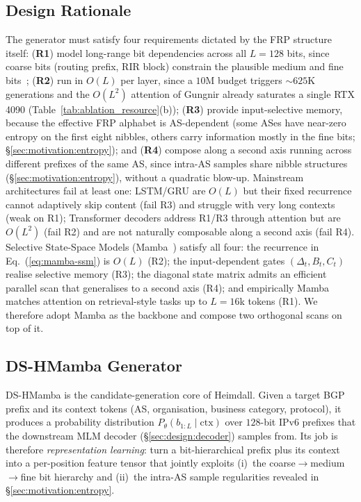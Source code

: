 \documentclass[conference]{IEEEtran}
\begin{document}
\subsection{Design Rationale}
\label{sec:design:why-mamba}
The generator must satisfy four requirements dictated by the FRP
structure itself:
(\textbf{R1}) model long-range bit dependencies across all $L{=}128$
bits, since coarse bits (routing prefix, RIR block) constrain the
plausible medium and fine
bits~\cite{hinden2006rfc4291,deering1998ipv6};
(\textbf{R2}) run in $O(L)$ per layer, since a $10$M budget triggers
$\sim\!625$K generations and the $O(L^2)$ attention of Gungnir already
saturates a single RTX 4090
(Table~\ref{tab:ablation_resource}(b));
(\textbf{R3}) provide input-selective memory, because the effective
FRP alphabet is AS-dependent (some ASes have near-zero entropy on the
first eight nibbles, others carry information mostly in the fine bits;
\S\ref{sec:motivation:entropy});
and (\textbf{R4}) compose along a second axis running across
different prefixes of the same AS, since intra-AS samples share
nibble structures (\S\ref{sec:motivation:entropy}), without a
quadratic blow-up.
Mainstream architectures fail at least one: LSTM/GRU are $O(L)$
but their fixed recurrence cannot adaptively skip content
(fail R3) and struggle with very long contexts (weak on R1);
Transformer decoders address R1/R3 through attention but are
$O(L^2)$ (fail R2) and are not naturally composable along a
second axis (fail R4).  Selective State-Space Models
(Mamba~\cite{gu2023mamba,gu2021s4}) satisfy all four: the
recurrence in Eq.~(\ref{eq:mamba-ssm}) is $O(L)$ (R2); the
input-dependent gates $(\Delta_t,B_t,C_t)$ realise selective
memory (R3); the diagonal state matrix admits an efficient
parallel scan that generalises to a second axis (R4); and
empirically Mamba matches attention on retrieval-style tasks up
to $L{=}16$k tokens (R1).  We therefore adopt Mamba as the
backbone and compose two orthogonal scans on top of it.

\subsection{DS-HMamba Generator}
\label{sec:design:model}
DS-HMamba is the candidate-generation
core of Heimdall.  Given a target BGP prefix and its context
tokens (AS, organisation, business category, protocol), it
produces a probability distribution
$P_\theta(b_{1:L}\mid\text{ctx})$ over $128$-bit IPv6 prefixes
that the downstream MLM decoder (\S\ref{sec:design:decoder})
samples from.  Its job is therefore \emph{representation
learning}: turn a bit-hierarchical prefix plus its context into
a per-position feature tensor that jointly exploits (i)~the
coarse$\to$medium$\to$fine bit hierarchy and (ii)~the intra-AS
sample regularities revealed in \S\ref{sec:motivation:entropy}.
\end{document}
